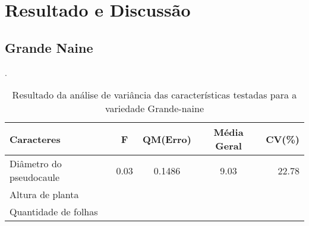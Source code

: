 \chapter{Resultado e Discussão}
\section{Grande Naine}

\begin{table}[!htb]
 	\begin{center}
 		\caption{Resultado da análise de variância das características testadas para a variedade Grande-naine}.
	 	\begin{tabular*}{\textwidth}{@{\extracolsep{\fill}}lcccr}
 		\toprule
 		\toprule
 		\textbf{Caracteres} & \textbf{F}  & \textbf{QM(Erro)} & \textbf{Média Geral} &\textbf {CV(\%)} \\
		\hline
		Diâmetro do pseudocaule & 0.03 & 0.1486 & 9.03 &  22.78 \\
		Altura de planta & & & & \\
		Quantidade de folhas & & & & \\
		\hline
		\hline
 		\end{tabular*}\\
 	\end{center}
\end{table}